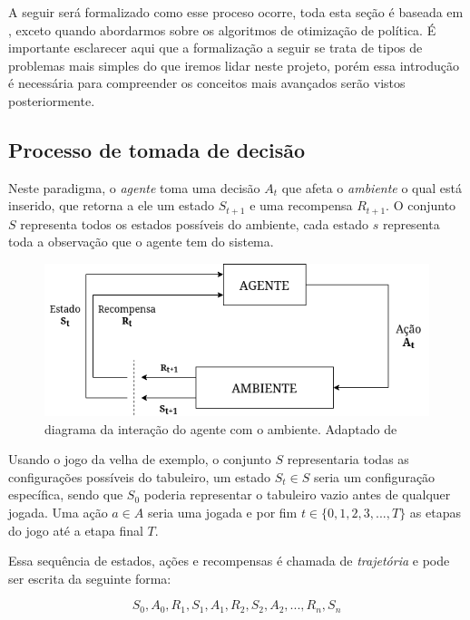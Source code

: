 A seguir será formalizado como esse proceso ocorre, toda esta seção é baseada em , exceto quando abordarmos sobre os algoritmos de otimização de política. É importante esclarecer aqui que a formalização a seguir se trata de tipos de problemas mais simples do que iremos lidar neste projeto, porém essa introdução é necessária para compreender os conceitos mais avançados serão vistos posteriormente.

\subsection{Processo de tomada de decisão} \label{mdp-section}
Neste paradigma, o \textit{agente} toma uma decisão $A_t$ que afeta o \textit{ambiente} o qual está inserido, que retorna a ele um estado $S_{t+1}$ e uma recompensa $R_{t+1}$. O conjunto $S$ representa todos os estados possíveis do ambiente, cada estado $s$ representa toda a observação que o agente tem do sistema. 

\begin{figure}[h]
   \centering
   \includegraphics[scale=0.75]{figs/RL-diagram.drawio.png}
    \caption{diagrama da interação do agente com o ambiente. Adaptado de }
    \label{fig:rl-diagram}
 \end{figure}

Usando o jogo da velha de exemplo, o conjunto $S$ representaria todas as configurações possíveis do tabuleiro, um estado $S_t \in S$ seria um configuração específica, sendo que $S_0$ poderia representar o tabuleiro vazio antes de qualquer jogada. Uma ação $a \in A$ seria uma jogada e por fim $t \in \{0,1,2,3,..., T\}$ as etapas do jogo até a etapa final $T$.

Essa sequência de estados, ações e recompensas é chamada de \textit{trajetória} e pode ser escrita da seguinte forma:

\begin{equation} \label{trajectory}
   S_0, A_0, R_1, S_1, A_1, R_2, S_2, A_2, ... , R_n, S_n
\end{equation}

